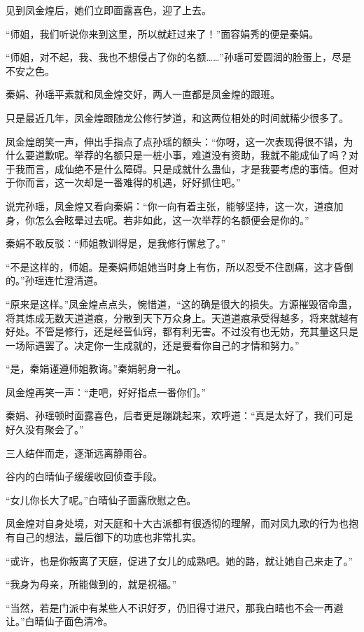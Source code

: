 \begin{this_body}
见到凤金煌后，她们立即面露喜色，迎了上去。

“师姐，我们听说你来到这里，所以就赶过来了！”面容娟秀的便是秦娟。

“师姐，对不起，我、我也不想侵占了你的名额……”孙瑶可爱圆润的脸蛋上，尽是不安之色。

秦娟、孙瑶平素就和凤金煌交好，两人一直都是凤金煌的跟班。

只是最近几年，凤金煌跟随龙公修行梦道，和这两位相处的时间就稀少很多了。

凤金煌朗笑一声，伸出手指点了点孙瑶的额头：“你呀，这一次表现得很不错，为什么要道歉呢。举荐的名额只是一桩小事，难道没有资助，我就不能成仙了吗？对于我而言，成仙绝不是什么障碍。只是成就什么蛊仙，才是我要考虑的事情。但对于你而言，这一次却是一番难得的机遇，好好抓住吧。”

说完孙瑶，凤金煌又看向秦娟：“你一向有着主张，能够坚持，这一次，道痕加身，你怎么会眩晕过去呢。若非如此，这一次举荐的名额便会是你的。”

秦娟不敢反驳：“师姐教训得是，是我修行懈怠了。”

“不是这样的，师姐。是秦娟师姐她当时身上有伤，所以忍受不住剧痛，这才昏倒的。”孙瑶连忙澄清道。

“原来是这样。”凤金煌点点头，惋惜道，“这的确是很大的损失。方源摧毁宿命蛊，将其炼成无数天道道痕，分散到天下万众身上。天道道痕承受得越多，将来就越有好处。不管是修行，还是经营仙窍，都有利无害。不过没有也无妨，充其量这只是一场际遇罢了。决定你一生成就的，还是要看你自己的才情和努力。”

“是，秦娟谨遵师姐教诲。”秦娟躬身一礼。

凤金煌再笑一声：“走吧，好好指点一番你们。”

秦娟、孙瑶顿时面露喜色，后者更是蹦跳起来，欢呼道：“真是太好了，我们可是好久没有聚会了。”

三人结伴而走，逐渐远离静雨谷。

谷内的白晴仙子缓缓收回侦查手段。

“女儿你长大了呢。”白晴仙子面露欣慰之色。

凤金煌对自身处境，对天庭和十大古派都有很透彻的理解，而对凤九歌的行为也抱有自己的想法，最后御下的功底也非常扎实。

“或许，也是你叛离了天庭，促进了女儿的成熟吧。她的路，就让她自己来走了。”

“我身为母亲，所能做到的，就是祝福。”

“当然，若是门派中有某些人不识好歹，仍旧得寸进尺，那我白晴也不会一再避让。”白晴仙子面色清冷。


\end{this_body}
